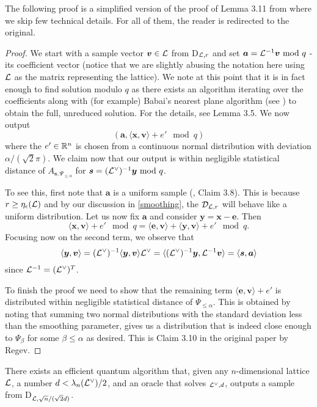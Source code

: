The following proof is a simplified version of the proof of Lemma 3.11 from \cite{regev} where we skip few technical details. For all of them, the reader is redirected to the original.
\begin{proof}
        We start with a sample vector $\boldsymbol{v} \in \mathcal{L}$ from D$_{\mathcal{L}, r}$ and set $\boldsymbol{a} = \mathcal{L}^{-1} \boldsymbol{v} \text{ mod } q$ - its coefficient vector (notice that we are slightly abusing the notation here using $\mathcal{L}$ as the matrix representing the lattice). We note at this point that it is in fact enough to find solution modulo $q$ as there exists an algorithm iterating over the coefficients along with (for example) Babai's nearest plane algorithm (see \cite{babai}) to obtain the full, unreduced solution. For the details, see \cite{regev} Lemma 3.5. We now output
        \begin{equation} (\bm{a}, \langle \bm{x}, \bm{v} \rangle + e' \mod q) \end{equation}
        where the $e' \in \mathbb{R}^n$ is chosen from a continuous normal distribution with deviation $\alpha/(\sqrt{2} \pi)$. We claim now that our output is within negligible statistical distance of $A_{\bm{s}, \Psi_{\leq \alpha}}$ for $\boldsymbol{s} = (\mathcal{L}^{\vee})^{-1}\boldsymbol{y} \text{ mod } q$.

        To see this, first note that $\bm{a}$ is a uniform sample (\cite{regev}, Claim 3.8). This is because $r \geq \eta_{\epsilon}(\mathcal{L})$ and by our discussion in \ref{smoothing}, the $\mathcal{D}_{\mathcal{L}, r}$ will behave like a uniform distribution. Let us now fix $\bm{a}$ and consider $\bm{y} = \bm{x} - \bm{e}$. Then
        \[ \langle \bm{x}, \bm{v} \rangle + e' \mod q = \langle \bm{e}, \bm{v} \rangle + \langle \bm{y}, \bm{v} \rangle + e' \mod q. \]
Focusing now on the second term, we observe that
\[ \langle \boldsymbol{y}, \boldsymbol{v} \rangle = (\mathcal{L}^{\vee})^{-1} \langle \boldsymbol{y}, \boldsymbol{v} \rangle \mathcal{L}^{\vee} =  \langle (\mathcal{L}^{\vee})^{-1}\boldsymbol{y}, \mathcal{L}^{-1} \boldsymbol{v} \rangle = \langle \boldsymbol{s}, \boldsymbol{a} \rangle \]
since $\mathcal{L}^{-1} = (\mathcal{L}^{\vee})^T$.

To finish the proof we need to show that the remaining term $\langle \bm{e}, \bm{v} \rangle + e'$ is distributed within negligible statistical distance of $\Psi_{\leq \alpha}$. This is obtained by noting that summing two normal distributions with the standard deviation less than the smoothing parameter, gives us a distribution that is indeed close enough to $\Psi_{\beta}$ for some $\beta \leq \alpha$ as desired. This is Claim 3.10 in the original paper by Regev.
\end{proof}
\begin{proposition}\label{quantum}
        There exists an efficient quantum algorithm that, given any $n$-dimensional lattice $\mathcal{L}$, a number $d < \lambda_n (\mathcal{L}^{\vee})/2$, and an oracle that solves $_{\mathcal{L}^{\vee},d}$, outputs a sample from D$_{\mathcal{L},\sqrt{n}/(\sqrt{2}d)}$.
\end{proposition}

